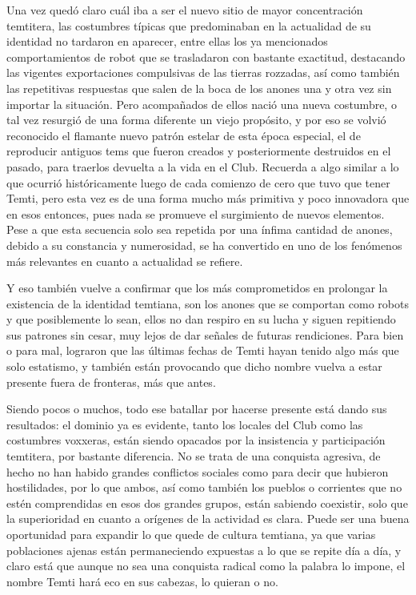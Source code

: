 \documentclass[
  spanish,
]{book}
\begin{document}
Una vez quedó claro cuál iba a ser el nuevo sitio de mayor concentración temtitera, las costumbres típicas que predominaban en la actualidad de su identidad no tardaron en aparecer, entre ellas los ya mencionados comportamientos de robot que se trasladaron con bastante exactitud, destacando las vigentes exportaciones compulsivas de las tierras rozzadas, así como también las repetitivas respuestas que salen de la boca de los anones una y otra vez sin importar la situación.
Pero acompañados de ellos nació una nueva costumbre, o tal vez resurgió de una forma diferente un viejo propósito, y por eso se volvió reconocido el flamante nuevo patrón estelar de esta época especial, el de reproducir antiguos tems que fueron creados y posteriormente destruidos en el pasado, para traerlos devuelta a la vida en el Club.
Recuerda a algo similar a lo que ocurrió históricamente luego de cada comienzo de cero que tuvo que tener Temti, pero esta vez es de una forma mucho más primitiva y poco innovadora que en esos entonces, pues nada se promueve el surgimiento de nuevos elementos. Pese a que esta secuencia solo sea repetida por una ínfima cantidad de anones, debido a su constancia y numerosidad, se ha convertido en uno de los fenómenos más relevantes en cuanto a actualidad se refiere.

Y eso también vuelve a confirmar que los más comprometidos en prolongar la existencia de la identidad temtiana, son los anones que se comportan como robots y que posiblemente lo sean, ellos no dan respiro en su lucha y siguen repitiendo sus patrones sin cesar, muy lejos de dar señales de futuras rendiciones. Para bien o para mal, lograron que las últimas fechas de Temti hayan tenido algo más que solo estatismo, y también están provocando que dicho nombre vuelva a estar presente fuera de fronteras, más que antes.

Siendo pocos o muchos, todo ese batallar por hacerse presente está dando sus resultados: el dominio ya es evidente, tanto los locales del Club como las costumbres voxxeras, están siendo opacados por la insistencia y participación temtitera, por bastante diferencia. No se trata de una conquista agresiva, de hecho no han habido grandes conflictos sociales como para decir que hubieron hostilidades, por lo que ambos, así como también los pueblos o corrientes que no estén comprendidas en esos dos grandes grupos, están sabiendo coexistir, solo que la superioridad en cuanto a orígenes de la actividad es clara.
Puede ser una buena oportunidad para expandir lo que quede de cultura temtiana, ya que varias poblaciones ajenas están permaneciendo expuestas a lo que se repite día a día, y claro está que aunque no sea una conquista radical como la palabra lo impone, el nombre Temti hará eco en sus cabezas, lo quieran o no.
\end{document}
